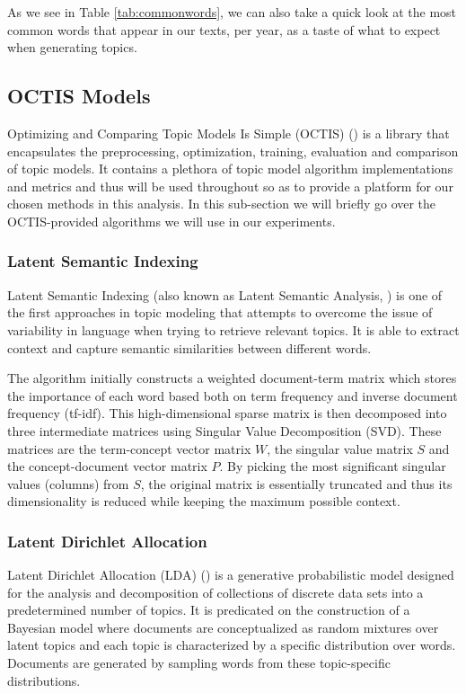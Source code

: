 As we see in Table \ref{tab:commonwords}, we can also take a quick look at the most common words that appear in our texts, per year, as a taste of what to expect when generating topics.

\subsection{OCTIS Models}

Optimizing and Comparing Topic Models Is Simple (OCTIS) (\cite{Terragni;Fersini;Galuzzi;Tropeano;Candelieri;21}) is a library that encapsulates the preprocessing, optimization, training, evaluation and comparison of topic models. It contains a plethora of topic model algorithm implementations and metrics and thus will be used throughout so as to provide a platform for our chosen methods in this analysis. In this sub-section we will briefly go over the OCTIS-provided algorithms we will use in our experiments.

\subsubsection{Latent Semantic Indexing} 
Latent Semantic Indexing (also known as Latent Semantic Analysis, \cite{Landauer;Thomas;Foltz;Peter;Laham;Darrell:98}) is one of the first approaches in topic modeling that attempts to overcome the issue of variability in language when trying to retrieve relevant topics. It is able to extract context and capture semantic similarities between different words.

The algorithm initially constructs a weighted document-term matrix which stores the importance of each word based both on term frequency and inverse document frequency (tf-idf). This high-dimensional sparse matrix is then decomposed into three intermediate matrices using Singular Value Decomposition (SVD). These matrices are the term-concept vector matrix $W$, the singular value matrix $S$ and the concept-document vector matrix $P$. By picking the most significant singular values (columns) from $S$, the original matrix is essentially truncated and thus its dimensionality is reduced while keeping the maximum possible context. 

\subsubsection{Latent Dirichlet Allocation}
Latent Dirichlet Allocation (LDA) (\cite{Blei;Ng;Jordan:03}) is a generative probabilistic model designed for the analysis and decomposition of collections of discrete data sets into a predetermined number of topics. It is predicated on the construction of a Bayesian model where documents are conceptualized as random mixtures over latent topics and each topic is characterized by a specific distribution over words. Documents are generated by sampling words from these topic-specific distributions.

